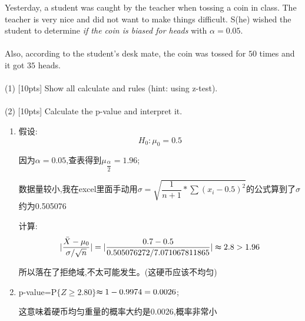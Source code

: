 \documentclass[11pt, a4paper, UTF8]{ctexart}
\begin{document}
\begin{problem}[ML problem 4]
Yesterday, a student was caught by the teacher when tossing a coin in class. The teacher is very nice and did not want to make things difficult. S(he) wished the student to determine \emph{if the coin is biased for heads} with $\alpha = 0.05$.\\ \\
Also, according to the student’s desk mate, the coin was tossed for $50$ times and it got $35$ heads. \\ \\
(1) [10pts] Show all calculate and rules (hint: using z-test). \\ \\
(2) [10pts] Calculate the p-value and interpret it.
\end{problem}
\begin{solution}
    \begin{enumerate}
    	\item 假设:$$H_0: \mu_0=0.5$$
    	
    	因为$\alpha =0.05$,查表得到$\mu_{\dfrac{\alpha}{2}}=1.96$;
    	
    	数据量较小,我在excel里面手动用$\sigma=\sqrt{\dfrac{1}{n+1}*\sum (x_i-0.5)^{2}}$的公式算到了$\sigma $约为0.505076
    	
    	计算:
    	$$|\dfrac{\bar{X}-\mu_0}{\sigma / \sqrt{n}}|=|\dfrac{0.7-0.5}{0.505076272
    	/7.071067811865
    }|\thickapprox 2.8>1.96$$

所以落在了拒绝域,不太可能发生。(这硬币应该不均匀)
\item p-value=P$\{Z\geq 2.80\}$$\thickapprox 1-0.9974=0.0026$;

这意味着硬币均匀重量的概率大约是0.0026,概率非常小
    \end{enumerate}
\end{solution}
\end{document}
